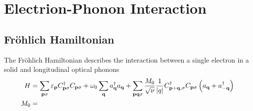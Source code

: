 \chapter{Electrion-Phonon Interaction}

\section{Fr\"{o}hlich Hamiltonian}
The Fr\"{o}hlich Hamiltonian describes the interaction between a single electron in a solid and longitudinal optical phonons
\begin{align}
  \label{7.1}
  H &= \sum_{\mathbf{p}\sigma} \varepsilon_{\mathbf{p}} C^{\dagger}_{\mathbf{p}\sigma} C_{\mathbf{p}\sigma} + \omega_0 \sum_{\mathbf{q}} a^{\dagger}_{\mathbf{q}}a_{\mathbf{q}} + \sum_{\mathbf{pq}\sigma} \frac{M_{0}}{\sqrt{\nu}} \frac{1}{\abs{q}} C^{\dagger}_{\mathbf{p+q},\sigma} C_{\mathbf{p}\sigma} \left( a_{\mathbf{q}} + a^{\dagger}_{\mathbf{-q}} \right) \nonumber \\
  M_0 &=
\end{align}



